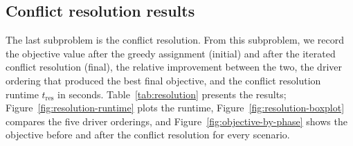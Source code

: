 \subsection{Conflict resolution results}

The last subproblem is the conflict resolution. From this subproblem, we record the objective value after the greedy assignment (initial) and after the iterated conflict resolution (final), the relative improvement between the two, the driver ordering that produced the best final objective, and the conflict resolution runtime $t_{\text{res}}$ in seconds. Table~\ref{tab:resolution} presents the results; Figure~\ref{fig:resolution-runtime} plots the runtime, Figure~\ref{fig:resolution-boxplot} compares the five driver orderings, and Figure~\ref{fig:objective-by-phase} shows the objective before and after the conflict resolution for every scenario.

